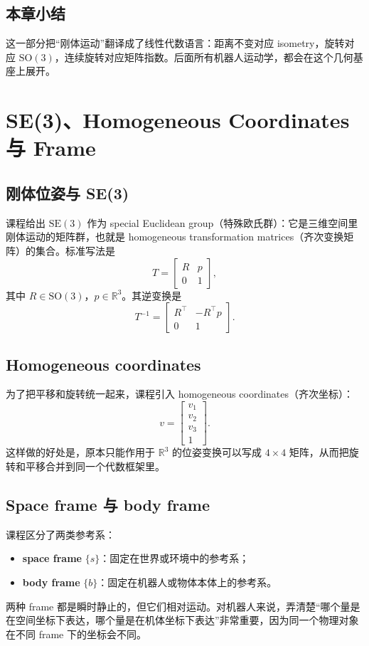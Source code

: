 \documentclass[a4paper]{article}
\begin{document}
\subsection{本章小结}
这一部分把“刚体运动”翻译成了线性代数语言：距离不变对应 isometry，旋转对应 \(\mathrm{SO}(3)\)，连续旋转对应矩阵指数。后面所有机器人运动学，都会在这个几何基座上展开。

\section{SE(3)、Homogeneous Coordinates 与 Frame}
\subsection{刚体位姿与 SE(3)}
课程给出 \(\mathrm{SE}(3)\) 作为 special Euclidean group（特殊欧氏群）：它是三维空间里刚体运动的矩阵群，也就是 homogeneous transformation matrices（齐次变换矩阵）的集合。标准写法是
\[
T=
\begin{bmatrix}
R & p\\
0 & 1
\end{bmatrix},
\]
其中 \(R \in \mathrm{SO}(3)\)，\(p \in \mathbb{R}^3\)。其逆变换是
\[
T^{-1}=
\begin{bmatrix}
R^\top & -R^\top p\\
0 & 1
\end{bmatrix}.
\]

\subsection{Homogeneous coordinates}
为了把平移和旋转统一起来，课程引入 homogeneous coordinates（齐次坐标）：
\[
v=
\begin{bmatrix}
v_1\\v_2\\v_3\\1
\end{bmatrix}.
\]
这样做的好处是，原本只能作用于 \( \mathbb{R}^3 \) 的位姿变换可以写成 \(4 \times 4\) 矩阵，从而把旋转和平移合并到同一个代数框架里。

\subsection{Space frame 与 body frame}
课程区分了两类参考系：
\begin{itemize}
    \item \textbf{space frame} \(\{s\}\)：固定在世界或环境中的参考系；
    \item \textbf{body frame} \(\{b\}\)：固定在机器人或物体本体上的参考系。
\end{itemize}
两种 frame 都是瞬时静止的，但它们相对运动。对机器人来说，弄清楚“哪个量是在空间坐标下表达，哪个量是在机体坐标下表达”非常重要，因为同一个物理对象在不同 frame 下的坐标会不同。
\end{document}
